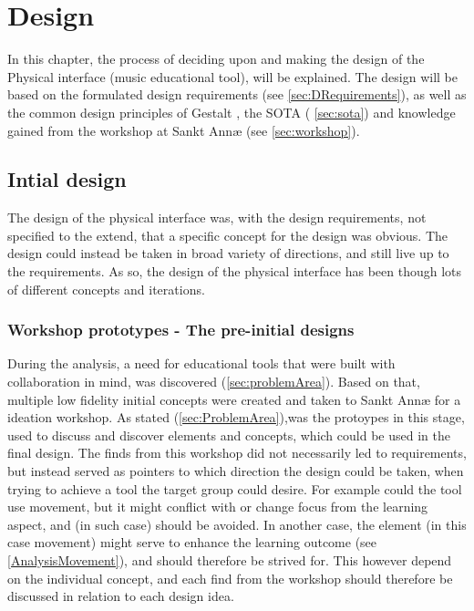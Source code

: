 \chapter{Design}

In this chapter, the process of deciding upon and making the design of the Physical interface (music educational tool), will be explained. The design will be based on the formulated design requirements (see \autoref{sec:DRequirements}), as well as the common design principles of Gestalt \cite{gestalt}, the SOTA ( \autoref{sec:sota}) and knowledge gained from the workshop at Sankt Annæ (see \autoref{sec:workshop}). 


\section{Intial design}
The design of the physical interface was, with the design requirements, not specified to the extend, that a specific concept for the design was obvious. The design could instead be taken in broad variety of directions, and still live up to the requirements. As so, the design of the physical interface has been though lots of different concepts and iterations. 

\subsection {Workshop prototypes - The pre-initial designs}
During the analysis, a need for educational tools that were built with collaboration in mind, was discovered (\autoref{sec:problemArea}). Based on that, multiple low fidelity initial concepts were created and taken to Sankt Annæ for a ideation workshop. As stated (\autoref{sec:ProblemArea}),was the protoypes in this stage, used to discuss and discover elements and concepts, which could be used in the final design. The finds from this workshop did not necessarily led to requirements, but instead served as pointers to which direction the design could be taken, when trying to achieve a tool the target group could desire. For example could the tool use movement, but it might conflict with or change focus from the learning aspect, and (in such case) should be avoided. In another case, the element (in this case movement) might serve to enhance the learning outcome (see \autoref{AnalysisMovement}), and should therefore be strived for. This however depend on the individual concept, and each find from the workshop should therefore be discussed in relation to each design idea. 
\\\\

